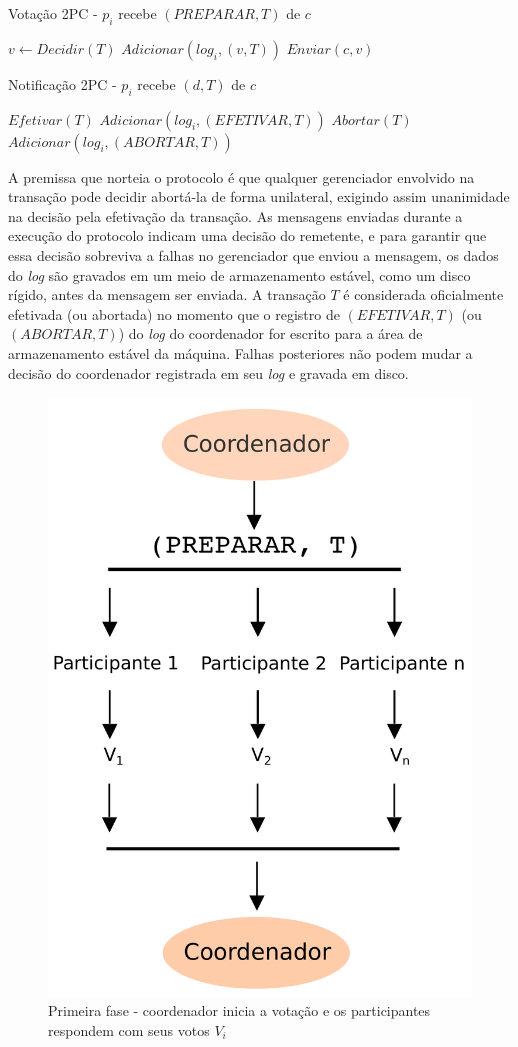 \documentclass[11pt,twoside,a4paper]{book}
\begin{document}
\begin{algorithm}
\caption{Votação 2PC - $p_i$ recebe $(PREPARAR, T)$ de $c$}
\label{alg:2pc_participante1}
\begin{algorithmic}[1]
\State $v \gets Decidir(T)$
\State $Adicionar(log_i, (v, T))$
\State $Enviar(c, v)$
\end{algorithmic}
\end{algorithm}

\begin{algorithm}
\caption{Notificação 2PC - $p_i$ recebe $(d, T)$ de $c$}
\label{alg:2pc_participante2}
\begin{algorithmic}[1]
	\State $Efetivar(T)$
	\State $Adicionar(log_i, (EFETIVAR, T))$
\Else
	\State $Abortar(T)$
	\State $Adicionar(log_i, (ABORTAR, T))$
\EndIf
\end{algorithmic}
\end{algorithm}

A premissa que norteia o protocolo é que qualquer gerenciador envolvido na transação pode decidir abortá-la de forma unilateral, exigindo assim unanimidade na decisão pela efetivação da transação. As mensagens enviadas durante a execução do protocolo indicam uma decisão do remetente, e para garantir que essa decisão sobreviva a falhas no gerenciador que enviou a mensagem, os dados do \emph{log} são gravados em um meio de armazenamento estável, como um disco rígido, antes da mensagem ser enviada. A transação $T$ é considerada oficialmente efetivada (ou abortada) no momento que o registro de $(EFETIVAR, T)$ (ou $(ABORTAR, T)$) do \emph{log} do coordenador for escrito para a área de armazenamento estável da máquina. Falhas posteriores não podem mudar a decisão do coordenador registrada em seu \emph{log} e gravada em disco.

\begin{figure}
  \centering
  \includegraphics[width=.40\textwidth]{2PC_1fase} 
  \caption{Primeira fase - coordenador inicia a votação e os participantes respondem com seus votos $V_i$}
  \label{fig:2PC_1fase} 
\end{figure}
\end{document}
